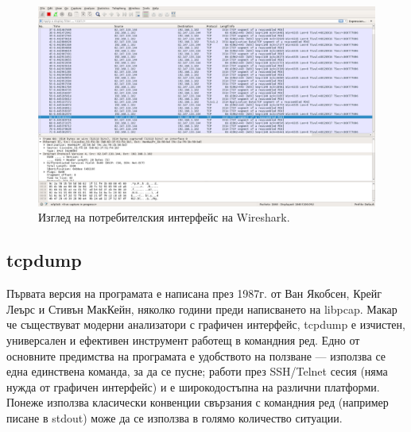 \documentclass[12pt,a4paper,oneside]{book}
\begin{document}
\begin{figure}[h!]
  \centering
  \includegraphics[width=1.0\textwidth]{figures/wireshark.png}
  \caption{Изглед на потребителския интерфейс на Wireshark.}
  \label{wireshark_fig}
\end{figure}

\subsection{tcpdump}

Първата версия на програмата е написана през 1987г. от Ван Якобсен,
Крейг Леърс и Стивън МакКейн, няколко години преди написването на libpcap.
Макар че
съществуват модерни анализатори с графичен интерфейс, tcpdump е
изчистен, универсален и ефективен инструмент работещ в командния ред. Едно от
основните предимства на програмата е удобството на ползване --- използва се една
единствена команда, за да се пусне; работи през SSH/Telnet сесия (няма нужда от
графичен интерфейс) и е широкодостъпна на различни платформи. Понеже използва класически
конвенции свързания с командния ред (например писане в stdout) може да се използва
в голямо количество ситуации.
\end{document}
